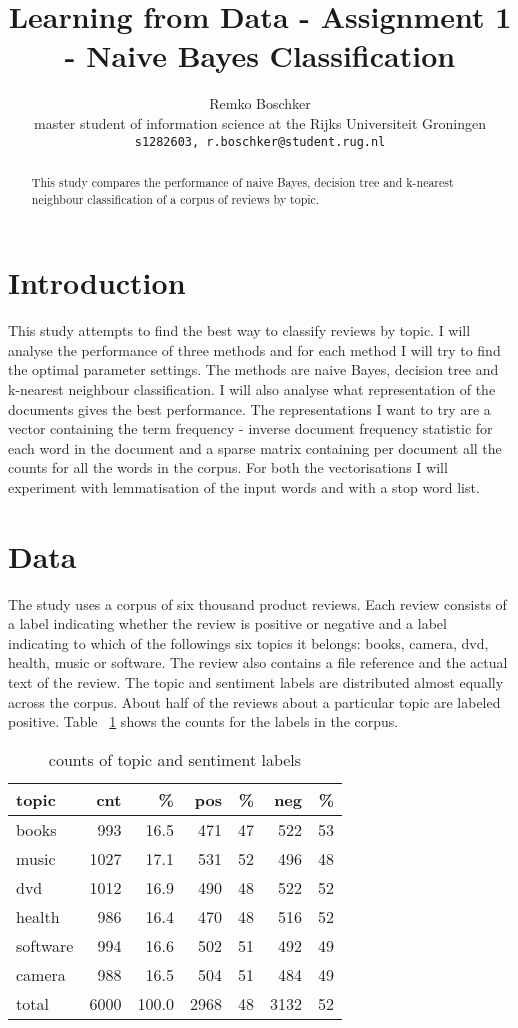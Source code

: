 \documentclass[11pt]{article}
\title{Learning from Data - Assignment 1 - Naive Bayes Classification}
\author{Remko Boschker \\
  master student of information science at the Rijks Universiteit Groningen \\
  {\tt s1282603, r.boschker@student.rug.nl} }
\date{}
\begin{document}
\maketitle
\begin{abstract}
This study compares the performance of naive Bayes, decision tree and k-nearest neighbour classification of a corpus of reviews by topic.
\end{abstract}

\section{Introduction}

This study attempts to find the best way to classify reviews by topic. I will analyse the performance of three methods and for each method I will try to find the optimal parameter settings. The methods are naive Bayes, decision tree and k-nearest neighbour classification. I will also analyse what representation of the documents gives the best performance. The representations I want to try are a vector containing the term frequency - inverse document frequency statistic for each word in the document and a sparse matrix containing per document all the counts for all the words in the corpus. For both the vectorisations I will experiment with lemmatisation of the input words and with a stop word list.

\section{Data}

The study uses a corpus of six thousand product reviews. Each review consists of a label indicating whether the review is positive or negative and a label indicating to which of the followings six topics it belongs: books, camera, dvd, health, music or software. The review also contains a file reference and the actual text of the review. The topic and sentiment labels are distributed almost equally across the corpus. About half of the reviews about a particular topic are labeled positive. Table ~\ref{tab:corpus} shows the counts for the labels in the corpus.

\begin{table}[h]\footnotesize
\label{tab:corpus}
\begin{tabular}{ l r r r r r r }
topic & cnt & \% & pos & \% & neg & \% \\
\hline
books & 993 & 16.5 & 471 & 47 & 522 & 53 \\
music & 1027 & 17.1 & 531 & 52 & 496 & 48 \\
dvd & 1012 & 16.9 & 490 & 48 & 522 & 52 \\
health & 986 & 16.4 & 470 & 48 & 516 & 52 \\
software & 994 & 16.6 & 502 & 51 & 492 & 49 \\
camera & 988 & 16.5 & 504 & 51 & 484 & 49 \\
\hline
total & 6000 & 100.0 & 2968 & 48 & 3132 & 52 \\
\end{tabular}
\caption{counts of topic and sentiment labels}
\end{table}
\end{document}
